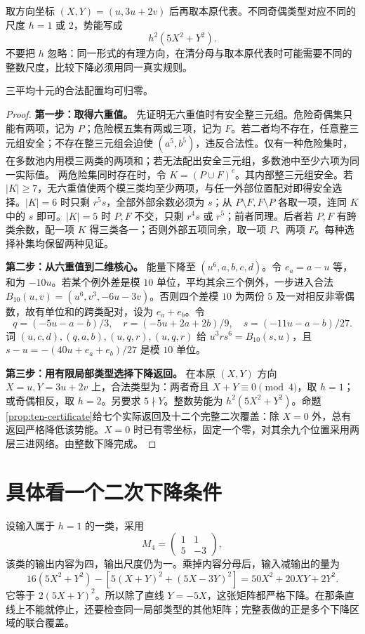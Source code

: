 取方向坐标 $(X,Y)=(u,3u+2v)$ 后再取本原代表。不同奇偶类型对应不同的尺度 $h=1$ 或 $2$，势能写成
\[h^2(5X^2+Y^2).
\]
不要把 $h$ 忽略：同一形式的有理方向，在清分母与取本原代表时可能需要不同的整数尺度，比较下降必须用同一真实规则。
\begin{lemma}[三平均十元的二次势能下降]\label{lem:ten}
三平均十元的合法配置均可归零。
\end{lemma}
\begin{proof}

\par\noindent\textbf{第一步：取得六重值。}
先证明无六重值时有安全整三元组。危险奇偶集只能有两项，记为 $P$；危险模五集有两或三项，记为 $F$。若二者均不存在，任意整三元组安全；不存在整三元组会迫使 $(a^5,b^5)$，违反合法性。仅有一种危险集时，在多数池内用模三两类的两项和；若无法配出安全三元组，多数池中至少六项为同一实际值。
两危险集同时存在时，令 $K=(P\cup F)^c$。其内部整三元组安全。若 $|K|\ge7$，无六重值使两个模三类均至少两项，与任一外部位置配对即得安全选择。$|K|=6$ 时只剩 $r^5s$，全部外部余数必须为 $s$；从 $P\setminus F,F\setminus P$ 各取一项，连同 $K$ 中的 $s$ 即可。$|K|=5$ 时 $P,F$ 不交，只剩 $r^4s$ 或 $r^5$；前者同理。后者若 $P,F$ 有跨类余数，配一项 $K$ 得三类各一；否则外部五项同余，取一项 $P$、两项 $F$。每种选择补集均保留两种见证。


\par\noindent\textbf{第二步：从六重值到二维核心。}
能量下降至 $(u^6,a,b,c,d)$。令 $e_a=a-u$ 等，和为 $-10u$。若某个例外差是模 $10$ 单位，平均其余三个例外，一步进入合法 $B_{10}(u,v)=(u^6,v^3,-6u-3v)$。否则四个差模 $10$ 为两份 $5$ 及一对相反非零偶数，故有单位和的跨类配对，设为 $e_a+e_b$。令
\[q=(-5u-a-b)/3,\quad r=(-5u+2a+2b)/9,\quad s=(-11u-a-b)/27.
\]
词 $(u,c,d),(q,a,b),(u,q,r),(u,q,r)$ 给 $u^3r s^6=B_{10}(s,u)$，且 $s-u=-(40u+e_a+e_b)/27$ 是模 $10$ 单位。


\par\noindent\textbf{第三步：用有限局部类型选择下降返回。}
在本原 $(X,Y)$ 方向 $X=u,Y=3u+2v$ 上，合法类型为：两者奇且 $X+Y\equiv0\pmod4$，取 $h=1$；或奇偶相反，取 $h=2$。另要求 $5\nmid Y$。整数势能为 $h^2(5X^2+Y^2)$。命题\ref{prop:ten-certificate}给七个实际返回及十二个完整二次覆盖：除 $X=0$ 外，总有返回严格降低该势能。$X=0$ 时已有零坐标，固定一个零，对其余九个位置采用两层三进网络。由整数下降完成。
\end{proof}

\section{具体看一个二次下降条件}
设输入属于 $h=1$ 的一类，采用
\[M_4=\begin{pmatrix}1&1\\5&-3\end{pmatrix},
\]
该类的输出内容为四，输出尺度仍为一。乘掉内容分母后，输入减输出的量为
\[
16(5X^2+Y^2)-[5(X+Y)^2+(5X-3Y)^2]
=50X^2+20XY+2Y^2.
\]
它等于 $2(5X+Y)^2$。所以除了直线 $Y=-5X$，这张矩阵都严格下降。在那条直线上不能就停止，还要检查同一局部类型的其他矩阵；完整表做的正是多个下降区域的联合覆盖。

